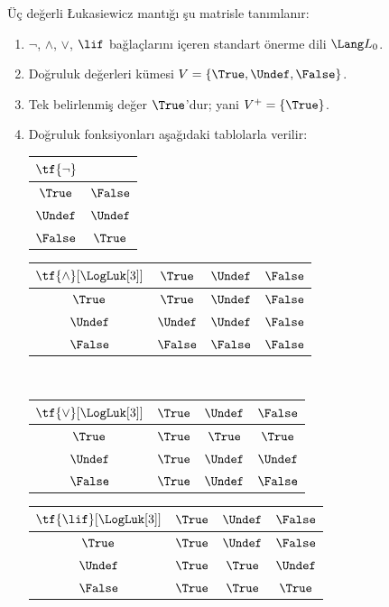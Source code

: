 \documentclass[../../../include/open-logic-section]{subfiles}
\begin{document}
\begin{defn}
Üç değerli \L ukasiewicz mantığı şu matrisle tanımlanır:
\begin{enumerate}
  \item $\lnot$, $\land$, $\lor$, $\lif$ bağlaçlarını içeren standart
  önerme dili $\Lang L_0$.
  \item Doğruluk değerleri kümesi $V = \{\True, \Undef, \False\}$.
  \item Tek belirlenmiş değer $\True$'dur; yani $V^+ = \{\True\}$.
  \item Doğruluk fonksiyonları aşağıdaki tablolarla verilir:
  \begin{center}
    \begin{tabular}{c|c} 
      $\tf{\lnot}$ & \\ 
      \hline  
      $\True$ & $\False$ \\ 
      $\Undef$ & $\Undef$ \\
      $\False$ & $\True$ 
    \end{tabular}
    \quad
    \begin{tabular}{c|ccc} 
      $\tf{\land}[\LogLuk[3]]$ & $\True$ & $\Undef$ & $\False$ \\ 
      \hline 
      $\True$ & $\True$ & $\Undef$ & $\False$ \\ 
      $\Undef$ & $\Undef$ & $\Undef$ & $\False$\\ 
      $\False$ & $\False$ & $\False$ & $\False$ 
    \end{tabular}
    \\[2ex]
    \begin{tabular}{c|ccc} 
      $\tf{\lor}[\LogLuk[3]]$ & $\True$ & $\Undef$ & $\False$ \\ 
      \hline 
      $\True$ & $\True$ & $\True$ & $\True$ \\ 
      $\Undef$ & $\True$ & $\Undef$ & $\Undef$ \\
      $\False$ & $\True$ & $\Undef$ & $\False$ 
    \end{tabular}
    \quad
    \begin{tabular}{c|ccc} 
      $\tf{\lif}[\LogLuk[3]]$ & $\True$ & $\Undef$ & $\False$ \\ 
      \hline 
      $\True$ & $\True$ & $\Undef$ & $\False$ \\ 
      $\Undef$ & $\True$ & $\True$ & $\Undef$  \\ 
      $\False$ & $\True$ & $\True$ & $\True$ 
    \end{tabular}
  \end{center} 
\end{enumerate}
\end{defn}
\end{document}
